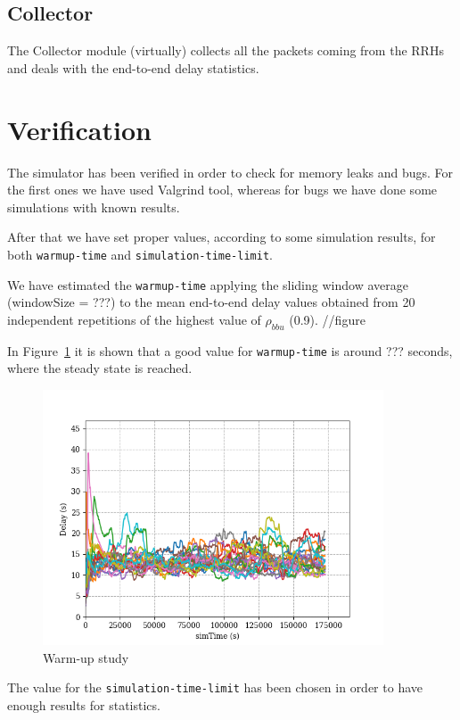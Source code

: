 \documentclass[11pt,a4paper,oneside, openright]{article}
\begin{document}
\subsection{Collector}
The Collector module (virtually) collects all the packets coming from the RRHs and deals with the end-to-end delay statistics.

\section{Verification}
The simulator has been verified in order to check for memory leaks and bugs.
For the first ones we have used Valgrind tool, whereas for bugs we have done some simulations with known results.

After that we have set proper values, according to some simulation results, for both \texttt{warmup-time} and \texttt{simulation-time-limit}.

We have estimated the \texttt{warmup-time} applying the sliding window average (windowSize = ???) to the mean end-to-end delay values obtained from 20 independent repetitions of the highest value of $ \rho_{bbu} $ (0.9).
//figure

In Figure~\ref{fig:warm-up-study} it is shown that a good value for \texttt{warmup-time} is around ??? seconds, where the steady state is reached. 

\begin{figure}[h]
    \centering
    \includegraphics[width=0.9\textwidth]{images/warm-up}
    \caption{Warm-up study}
    \label{fig:warm-up-study}
\end{figure}

The value for the \texttt{simulation-time-limit} has been chosen in order to have enough results for statistics.
\end{document}
